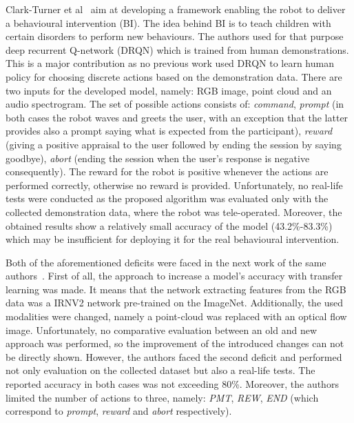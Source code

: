 \documentclass[thesis]{mas_proposal}
\begin{document}
Clark-Turner et al~\cite{ClarkTurner2017} aim at developing a framework enabling the robot to deliver a behavioural intervention (BI). The idea behind BI is to teach children with certain disorders to perform new behaviours. The authors used for that purpose deep recurrent Q-network (DRQN) which is trained from human demonstrations. This is a major contribution as no previous work used DRQN to learn human policy for choosing discrete actions based on the demonstration data. There are two inputs for the developed model, namely: RGB image, point cloud and an audio spectrogram. The set of possible actions consists of: \emph{command}, \emph{prompt} (in both cases the robot waves and greets the user, with an exception that the latter provides also a prompt saying what is expected from the participant), \emph{reward} (giving a positive appraisal to the user followed by ending the session by saying goodbye), \emph{abort} (ending the session when the user's response is negative consequently). The reward for the robot is positive whenever the actions are performed correctly, otherwise no reward is provided. Unfortunately, no real-life tests were conducted as the proposed algorithm was evaluated only with the collected demonstration data, where the robot was tele-operated. Moreover, the obtained results show a relatively small accuracy of the model (43.2\%-83.3\%) which may be insufficient for deploying it for the real behavioural intervention.

Both of the aforementioned deficits were faced in the next work of the same authors~\cite{Turner2018}. First of all, the approach to increase a model's accuracy with transfer learning was made. It means that the network extracting features from the RGB data was a IRNV2 network pre-trained on the ImageNet. Additionally, the used modalities were changed, namely a point-cloud was replaced with an optical flow image. Unfortunately, no comparative evaluation between an old and new approach was performed, so the improvement of the introduced changes can not be directly shown. However, the authors faced the second deficit and performed not only evaluation on the collected dataset but also a real-life tests. The reported accuracy in both cases was not exceeding 80\%. Moreover, the authors limited the number of actions to three, namely: \emph{PMT}, \emph{REW}, \emph{END} (which correspond to \emph{prompt}, \emph{reward} and \emph{abort} respectively).
\end{document}
